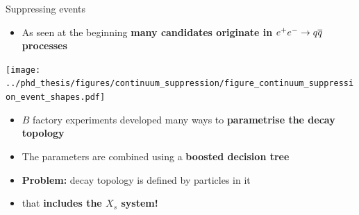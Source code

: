 \documentclass[xcolor=dvipsnames]{beamer}
\begin{document}
\begin{frame}{Suppressing \qqbar events}
   \centering\scriptsize
   \begin{itemize}
      \item As seen at the beginning \textbf{many candidates originate in} {\boldmath$e^+e^-\rightarrow q\overline q$} \textbf{processes}
   \end{itemize}

   \texttt{[image: ../phd\_thesis/figures/continuum\_suppression/figure\_continuum\_suppression\_event\_shapes.pdf]}

\begin{itemize}
\item $B$ factory experiments developed many ways to \textbf{parametrise the decay topology}
\item The parameters are combined using a \textbf{boosted decision tree}
\item \textbf{Problem:} decay topology is defined by particles in it 
\item[\ra] that \textbf{includes the $X_s$ system!}
\end{itemize}


\end{frame}




\end{document}
